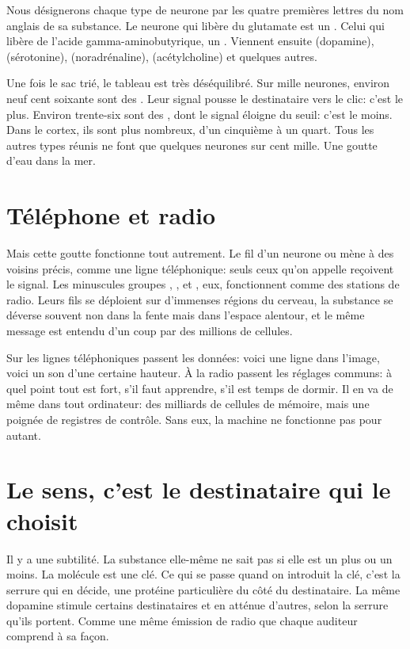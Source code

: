 Nous désignerons chaque type de neurone par les quatre premières lettres du nom anglais de sa substance. Le neurone qui libère du glutamate est un . Celui qui libère de l'acide gamma-aminobutyrique, un . Viennent ensuite  (dopamine),  (sérotonine),  (noradrénaline),  (acétylcholine) et quelques autres.

Une fois le sac trié, le tableau est très déséquilibré. Sur mille neurones, environ neuf cent soixante sont des . Leur signal pousse le destinataire vers le clic: c'est le \og plus\fg{}. Environ trente-six sont des , dont le signal éloigne du seuil: c'est le \og moins\fg{}. Dans le cortex, ils sont plus nombreux, d'un cinquième à un quart. Tous les autres types réunis ne font que quelques neurones sur cent mille. Une goutte d'eau dans la mer.

\section*{Téléphone et radio}

Mais cette goutte fonctionne tout autrement. Le fil d'un neurone  ou  mène à des voisins précis, comme une ligne téléphonique: seuls ceux qu'on appelle reçoivent le signal. Les minuscules groupes , ,  et , eux, fonctionnent comme des stations de radio. Leurs fils se déploient sur d'immenses régions du cerveau, la substance se déverse souvent non dans la fente mais dans l'espace alentour, et le même message est entendu d'un coup par des millions de cellules.

Sur les lignes téléphoniques passent les données: voici une ligne dans l'image, voici un son d'une certaine hauteur. À la radio passent les réglages communs: à quel point tout est fort, s'il faut apprendre, s'il est temps de dormir. Il en va de même dans tout ordinateur: des milliards de cellules de mémoire, mais une poignée de registres de contrôle. Sans eux, la machine ne fonctionne pas pour autant.

\section*{Le sens, c'est le destinataire qui le choisit}

Il y a une subtilité. La substance elle-même ne sait pas si elle est un \og plus\fg{} ou un \og moins\fg{}. La molécule est une clé. Ce qui se passe quand on introduit la clé, c'est la serrure qui en décide, une protéine particulière du côté du destinataire. La même dopamine stimule certains destinataires et en atténue d'autres, selon la serrure qu'ils portent. Comme une même émission de radio que chaque auditeur comprend à sa façon.

